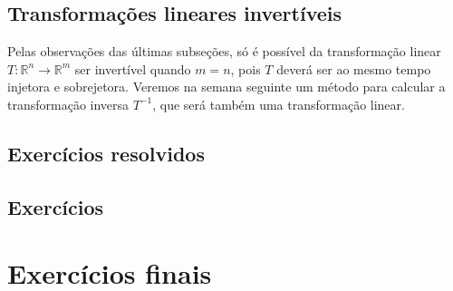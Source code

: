 \subsection{Transformações lineares invertíveis}

Pelas observações das últimas subseções, só é possível da transformação linear $T: \mathbb{R}^n \to \mathbb{R}^m$ ser invertível quando $m=n$, pois $T$ deverá ser ao mesmo tempo injetora e sobrejetora. Veremos na semana seguinte um método para calcular a transformação inversa $T^{-1}$, que será também uma transformação linear.

\subsection*{Exercícios resolvidos}

\construirExeresol

\subsection*{Exercícios}

\construirExer

\section{Exercícios finais}

\construirExer

%
